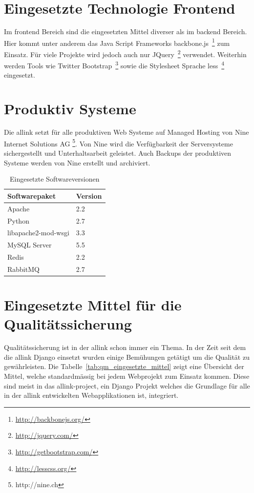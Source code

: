 \section{Eingesetzte Technologie Frontend}
\label{sec:eingesetzte_technologie_frontend}
Im frontend Bereich sind die eingesetzten Mittel diverser als im backend Bereich. Hier kommt unter anderem das  Java Script Frameworks backbone.js~\footnote{\url{http://backbonejs.org/}} zum Einsatz. Für viele Projekte wird jedoch auch nur JQuery~\footnote{\url{http://jquery.com/}} verwendet. Weiterhin werden Tools wie Twitter Bootstrap~\footnote{\url{http://getbootstrap.com/}} sowie die Stylesheet Sprache less~\footnote{\url{http://lesscss.org/}} eingesetzt.

\section{Produktiv Systeme}
\label{sec:produktiv_systeme}
Die allink setzt für alle produktiven Web Systeme auf Managed Hosting von Nine Internet Solutions AG \footnote{http://nine.ch}. Von Nine wird die Verfügbarkeit der Serversysteme sichergestellt und Unterhaltsarbeit geleistet. Auch Backups der produktiven Systeme werden von Nine erstellt und archiviert.

\begin{table}[ht]
  \centering
  \begin{tabular}{ll}
  \toprule
    Softwarepaket & Version\\
  \midrule
    Apache & 2.2\\
  \hline
    Python & 2.7\\
  \hline
    libapache2-mod-wsgi & 3.3\\
  \hline
    MySQL Server & 5.5\\
  \hline
    Redis & 2.2\\
  \hline
    RabbitMQ & 2.7\\
  \bottomrule
  \end{tabular}
  \caption{Eingesetzte Softwareversionen}
  \label{tab:eingesetzte_softwareversionen}
\end{table}

\section{Eingesetzte Mittel für die Qualitätssicherung}
\label{sec:eingesetzte_mittel_für_die_qualitätssicherung}
Qualitätssicherung ist in der allink schon immer ein Thema. In der Zeit seit dem die allink Django einsetzt wurden einige Bemühungen getätigt um die Qualität zu gewährleisten. Die Tabelle~\ref{tab:qm_eingesetzte_mittel} zeigt eine Übersicht der Mittel, welche standardmässig bei jedem Webprojekt zum Einsatz kommen. Diese sind meist in das allink-project, ein Django Projekt welches die Grundlage für alle in der allink entwickelten Webapplikationen ist, integriert.

